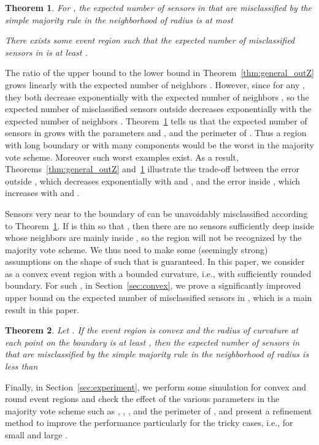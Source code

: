 \documentclass{article}
\newtheorem{theorem}{Theorem}
\begin{document}
\begin{theorem}\label{thm:general_inZ}
For , the expected number of sensors in  that are misclassified by the simple majority rule in the neighborhood of radius  is at most

There exists some event region  such that the expected number of misclassified sensors in  is at least .
\end{theorem}

The ratio of the upper bound to the lower bound in Theorem~\ref{thm:general_outZ} grows linearly with the expected number of neighbors . However, since  for any , they both decrease exponentially with the expected number of neighbors , so the expected number of misclassified sensors outside  decreases exponentially with the expected number of neighbors . Theorem~\ref{thm:general_inZ} tells us that the expected number of sensors in  grows with the parameters  and , and the perimeter of . Thus a region  with long boundary or with many components would be the worst in the majority vote scheme. Moreover such worst examples exist. As a result, Theorems~\ref{thm:general_outZ} and~\ref{thm:general_inZ} illustrate the trade-off between the error outside , which decreases exponentially with  and , and the error inside , which increases with  and .

\par
Sensors very near to the boundary of  can be unavoidably misclassified according to Theorem~\ref{thm:general_inZ}. If  is thin so that , then there are no sensors sufficiently deep inside  whose neighbors are mainly inside , so the region will not be recognized by the majority vote scheme. We thus need to make some (seemingly strong) assumptions on the shape of  such that  is guaranteed. In this paper, we consider  as a convex event region with a bounded curvature, i.e., with sufficiently rounded boundary. For such , in Section~\ref{sec:convex}, we prove a significantly improved upper bound on the expected number of misclassified sensors in , which is a main result in this paper.

\begin{theorem}\label{thm:convex}
Let . If the event region  is convex and the radius of curvature at each point on the boundary is at least , then the expected number of sensors in  that are misclassified by the simple majority rule in the neighborhood of radius  is less than

\end{theorem}

Finally, in Section~\ref{sec:experiment}, we perform some simulation for convex and round event regions and check the effect of the various parameters in the majority vote scheme such as , , , and the perimeter of , and present a refinement method to improve the performance particularly for the tricky cases, i.e., for small  and large .
\end{document}
